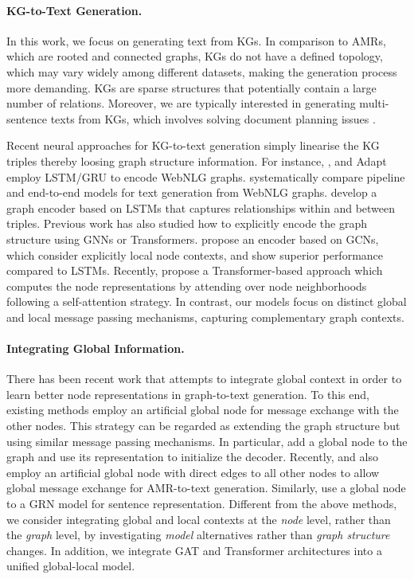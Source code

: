 \documentclass[11pt,a4paper]{article}
\begin{document}
\paragraph{KG-to-Text Generation.} In this work, we focus on generating text from KGs. In comparison to AMRs, which are rooted and connected graphs, KGs do not have a defined topology, which may vary widely among different datasets, making the generation process more demanding. KGs are sparse structures that potentially contain a large number of relations. Moreover, we are typically interested in generating multi-sentence texts from KGs, which involves solving document planning issues \cite{konstas-lapata-2013-inducing}. 


Recent neural approaches for KG-to-text generation simply linearise the KG triples thereby loosing graph structure information.  For instance, \citet{colin-gardent-2018-generating}, \citet{moryossef-etal-2019-step} and Adapt \cite{gardent-etal-2017-webnlg} employ LSTM/GRU to encode WebNLG graphs. \citet{castro-ferreira-etal-2019-neural} systematically compare pipeline and end-to-end models for text generation from WebNLG graphs.
\citet{trisedya-etal-2018-gtr} develop a graph encoder based on LSTMs that captures relationships within and between triples.
Previous work has also studied how to explicitly encode the graph structure using GNNs or Transformers. \citet{marcheggiani-icnl18} propose an encoder based on GCNs, which consider explicitly local node contexts, and show superior performance compared to LSTMs. Recently, \citet{koncel-kedziorski-etal-2019-text} propose a Transformer-based approach which computes the node representations by attending over node neighborhoods following a self-attention strategy. In contrast, our models focus on distinct global and local message passing mechanisms, capturing complementary graph contexts. 

\paragraph{Integrating Global Information.} There has been recent work that attempts to integrate global context in order to learn better node representations in graph-to-text generation. To this end, existing methods employ an artificial global node for message exchange with the other nodes. This strategy can be regarded as extending the graph structure but using similar message passing mechanisms. In particular, \citet{koncel-kedziorski-etal-2019-text} add a global node to the graph and use its representation to initialize the decoder. Recently, \citet{dcgcnforgraph2seq19guo} and \citet{cai-lam-2020-graph} also employ an artificial global node with direct edges to all other nodes to allow global message exchange for AMR-to-text generation. Similarly, \citet{zhang-etal-2018-sentence} use a global node to a GRN model for sentence representation. Different from the above methods, we consider integrating global and local contexts at the {\it node} level, rather than the {\it graph} level, by investigating {\it model} alternatives rather than {\it graph structure} changes. In addition, we integrate GAT and Transformer architectures into a unified global-local model.
\end{document}

